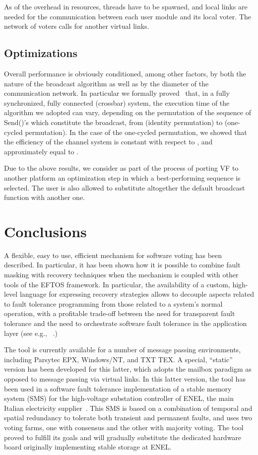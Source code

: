 \documentclass[11pt]{article}
\begin{document}
As of the overhead in resources,  threads have to be spawned,
and  local links are needed for the communication between each
user module and its local voter.
The network of voters calls for another 
 virtual links.

\subsection{Optimizations}
Overall performance is obviously conditioned, among other factors, by both the nature
of the broadcast algorithm as well as by the diameter
of the communication network. In particular we formally
proved~\cite{Pip} that, in a fully synchronized, fully connected (crossbar) system,
the execution time of the algorithm we adopted can vary,
depending on the permutation of the sequence of {\sf Send()}'s which constitute the
broadcast, from  (identity permutation)
to  (one-cycled permutation). In the case of the one-cycled permutation,
we showed that the efficiency of
the channel system is constant with respect to , and approximately equal to .

Due to the above results, we consider as part of the process of
porting VF to another platform
an optimization step in which a best-performing sequence
is selected. The user is also allowed
to substitute altogether the default broadcast function with another one.

\section{Conclusions}\label{end}
A flexible, easy to use, efficient mechanism for software voting 
has been described. In particular, it has been
shown how it is possible to combine fault masking with recovery techniques
when the mechanism is coupled with other tools of the EFTOS framework.
In particular, the availability of a custom, high-level language for
expressing recovery strategies allows to decouple aspects related
to fault tolerance programming from those related to a system's normal operation,
with a profitable trade-off between the need for transparent fault tolerance and
the need to orchestrate software fault tolerance in the application layer
(see e.g., ~\cite{HuKi93,Sal84}.)

The tool is currently available for a number of message passing environments, including
Parsytec EPX, Windows/NT, and TXT TEX.
A special, ``static'' version has been developed for this latter, which adopts
the mailbox paradigm as opposed to message passing via virtual links.
In this latter version, the tool has been used in a software fault tolerance 
implementation of a stable memory system (SMS) for the high-voltage substation 
controller of ENEL, the main Italian electricity supplier~\cite{DBCD98}.
This SMS is based on a combination of temporal and spatial redundancy
to tolerate both transient and permanent faults,
and uses two voting farms, one with consensus and the other with majority
voting. The tool proved to fulfill its goals and will gradually substitute
the dedicated hardware board originally implementing stable storage
at ENEL.
\end{document}
